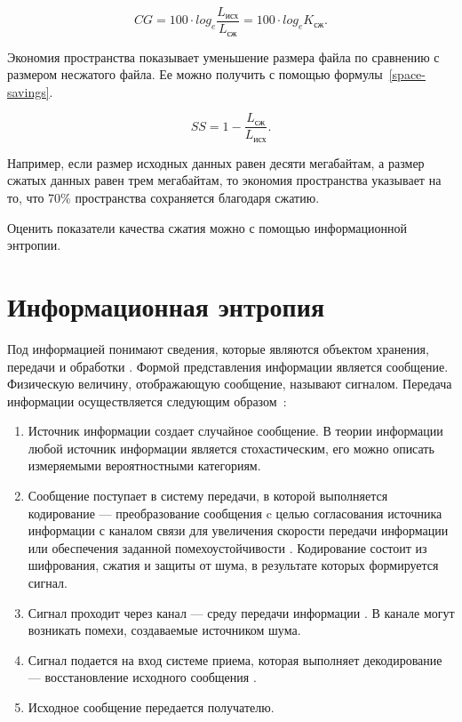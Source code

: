 \begin{equation}\label{compression-gain}
	CG = 100 \cdot log_e \frac{L_{\text{исх}}}{L_{\text{сж}}} = 100 \cdot log_e K_{\text{сж}}.
\end{equation}

Экономия пространства показывает уменьшение размера файла по сравнению с размером несжатого файла. Ее можно получить с помощью формулы~\ref{space-savings}.

\begin{equation}\label{space-savings}
	SS = 1 - \frac{L_{\text{сж}}}{L_{\text{исх}}}.
\end{equation}

Например, если размер исходных данных равен десяти мегабайтам, а размер сжатых данных равен трем мегабайтам, то экономия пространства указывает на то, что 70\% пространства сохраняется благодаря сжатию.

Оценить показатели качества сжатия можно с помощью информационной энтропии.

\section{Информационная энтропия}\label{ientropy}

Под информацией понимают сведения, которые являются объектом хранения, передачи и обработки \cite{information}. Формой представления информации является сообщение. Физическую величину, отображающую сообщение, называют сигналом. Передача информации осуществляется следующим образом~\cite{transmission}:

\begin{enumerate}
	\item Источник информации создает случайное сообщение. В теории информации любой источник информации является стохастическим, его можно описать измеряемыми вероятностными категориям.
	\item Сообщение поступает в систему передачи, в которой выполняется кодирование --- преобразование сообщения c целью согласования источника информации с каналом связи для увеличения скорости передачи информации или обеспечения заданной помехоустойчивости  \cite{information}. Кодирование состоит из шифрования, сжатия и защиты от шума, в результате которых формируется сигнал. 
	\item Сигнал проходит через канал --- среду передачи информации \cite{transmission}. В канале могут возникать помехи, создаваемые источником шума.
	\item Сигнал подается на вход системе приема, которая выполняет декодирование --- восстановление исходного сообщения \cite{information}.
	\item Исходное сообщение передается получателю.
\end{enumerate}

